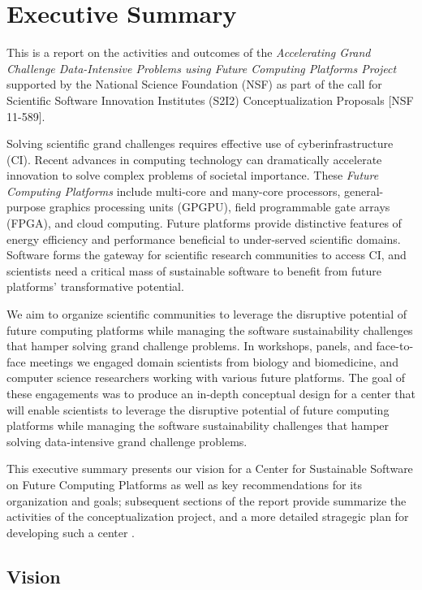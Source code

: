 \section{Executive Summary}
 This is a report on the activities and outcomes of the 
\textit{Accelerating Grand Challenge Data-Intensive 
Problems using Future Computing Platforms Project}
supported by the National Science Foundation (NSF) 
as part of the call for Scientific Software Innovation Institutes (S2I2) 
Conceptualization Proposals [NSF 11-589]. 

Solving scientific grand challenges requires effective use of cyberinfrastructure (CI).
Recent advances in computing technology can dramatically accelerate innovation 
to solve complex problems of societal importance. 
These \textit{Future Computing Platforms} include 
multi-core and many-core processors,
general-purpose graphics processing units (GPGPU),
field programmable gate arrays (FPGA), and
cloud computing. 
Future platforms provide distinctive features
of energy efficiency and performance beneficial 
to under-served scientific domains. 
Software forms the gateway for scientific research communities to access CI, 
and scientists need a critical mass of
sustainable software to benefit from future platforms’ transformative potential.


We aim to organize scientific communities to leverage the disruptive potential of future
computing platforms while managing the software sustainability challenges that hamper solving
grand challenge problems.
In workshops, panels, and face-to-face meetings we engaged
domain scientists from biology and biomedicine, 
and 
computer science researchers working with various future platforms.
The goal of these engagements 
was to produce an in-depth conceptual design for a center that will enable scientists to leverage the disruptive potential of future computing platforms while managing the software sustainability challenges that hamper solving data-intensive grand challenge problems.


This executive summary presents our vision for a Center for Sustainable Software on Future Computing Platforms as well as key recommendations for its organization and goals; subsequent sections of the report provide  summarize the activities 
of the conceptualization project, and a more detailed stragegic plan for developing such a center .

\subsection{Vision}

